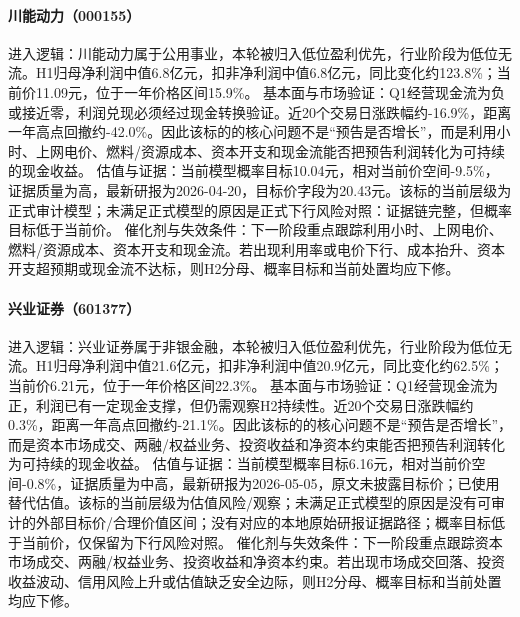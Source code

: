 \paragraph{川能动力（000155）}
进入逻辑：川能动力属于公用事业，本轮被归入低位盈利优先，行业阶段为低位无流。H1归母净利润中值6.8亿元，扣非净利润中值6.8亿元，同比变化约123.8\%；当前价11.09元，位于一年价格区间15.9\%。
基本面与市场验证：Q1经营现金流为负或接近零，利润兑现必须经过现金转换验证。近20个交易日涨跌幅约-16.9\%，距离一年高点回撤约-42.0\%。因此该标的的核心问题不是“预告是否增长”，而是利用小时、上网电价、燃料/资源成本、资本开支和现金流能否把预告利润转化为可持续的现金收益。
估值与证据：当前模型概率目标10.04元，相对当前价空间-9.5\%，证据质量为高，最新研报为2026-04-20，目标价字段为20.43元。该标的当前层级为正式审计模型；未满足正式模型的原因是正式下行风险对照：证据链完整，但概率目标低于当前价。
催化剂与失效条件：下一阶段重点跟踪利用小时、上网电价、燃料/资源成本、资本开支和现金流。若出现利用率或电价下行、成本抬升、资本开支超预期或现金流不达标，则H2分母、概率目标和当前处置均应下修。

\paragraph{兴业证券（601377）}
进入逻辑：兴业证券属于非银金融，本轮被归入低位盈利优先，行业阶段为低位无流。H1归母净利润中值21.6亿元，扣非净利润中值20.9亿元，同比变化约62.5\%；当前价6.21元，位于一年价格区间22.3\%。
基本面与市场验证：Q1经营现金流为正，利润已有一定现金支撑，但仍需观察H2持续性。近20个交易日涨跌幅约0.3\%，距离一年高点回撤约-21.1\%。因此该标的的核心问题不是“预告是否增长”，而是资本市场成交、两融/权益业务、投资收益和净资本约束能否把预告利润转化为可持续的现金收益。
估值与证据：当前模型概率目标6.16元，相对当前价空间-0.8\%，证据质量为中高，最新研报为2026-05-05，原文未披露目标价；已使用替代估值。该标的当前层级为估值风险/观察；未满足正式模型的原因是没有可审计的外部目标价/合理价值区间；没有对应的本地原始研报证据路径；概率目标低于当前价，仅保留为下行风险对照。
催化剂与失效条件：下一阶段重点跟踪资本市场成交、两融/权益业务、投资收益和净资本约束。若出现市场成交回落、投资收益波动、信用风险上升或估值缺乏安全边际，则H2分母、概率目标和当前处置均应下修。

